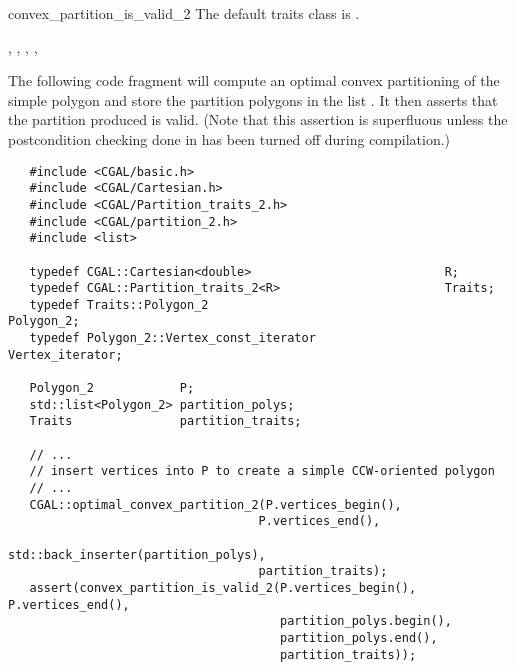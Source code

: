 \begin{ccRefFunction}{convex_partition_is_valid_2}
The default traits class  is .%

\ccSeeAlso

,
,
,
,

\ccExample

The following code fragment will compute an optimal
convex partitioning of the simple polygon  
and store the partition polygons in the list .
It then asserts that the partition produced is valid. 
(Note that this assertion is superfluous unless the postcondition checking
done in  has been turned off during
compilation.)

\begin{verbatim}
   #include <CGAL/basic.h>
   #include <CGAL/Cartesian.h>
   #include <CGAL/Partition_traits_2.h>
   #include <CGAL/partition_2.h>
   #include <list>

   typedef CGAL::Cartesian<double>                           R;
   typedef CGAL::Partition_traits_2<R>                       Traits;
   typedef Traits::Polygon_2                                 Polygon_2;
   typedef Polygon_2::Vertex_const_iterator                  Vertex_iterator;

   Polygon_2            P;
   std::list<Polygon_2> partition_polys;
   Traits               partition_traits;

   // ...
   // insert vertices into P to create a simple CCW-oriented polygon
   // ...
   CGAL::optimal_convex_partition_2(P.vertices_begin(),
                                   P.vertices_end(),
                                   std::back_inserter(partition_polys),
                                   partition_traits);
   assert(convex_partition_is_valid_2(P.vertices_begin(), P.vertices_end(),
                                      partition_polys.begin(), 
                                      partition_polys.end(),
                                      partition_traits));
\end{verbatim}

\end{ccRefFunction}
\renewcommand\ccRefPageBegin{\ccParDims\cgalColumnLayout}
\renewcommand\ccRefPageEnd{\ccParDims\cgalColumnLayout}
